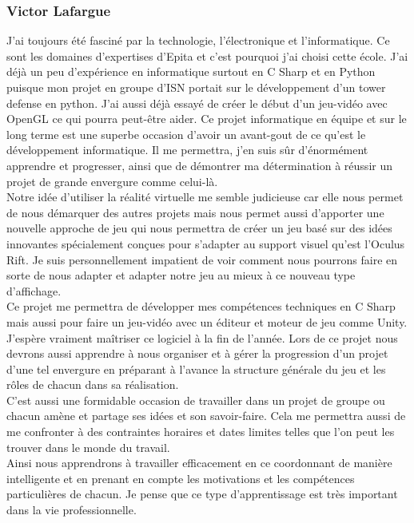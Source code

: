 \documentclass[12pt]{article}
\begin{document}
\subsubsection{Victor Lafargue}

J'ai toujours été fasciné par la technologie, l'électronique et l'informatique. Ce sont les domaines d'expertises d'Epita et c'est pourquoi j'ai choisi cette école. J'ai déjà un peu d'expérience en informatique surtout en \gls{C Sharp} et en \gls{Python} puisque mon projet en groupe d'ISN portait sur le développement d'un tower defense en python. J'ai aussi déjà essayé de créer le début d'un jeu-vidéo avec \gls{OpenGL} ce qui pourra peut-être aider. Ce projet informatique en équipe et sur le long terme est une superbe occasion d'avoir un  avant-gout de ce qu'est le développement informatique. Il me permettra, j'en suis sûr d'énormément apprendre et progresser, ainsi que de démontrer ma détermination à réussir un projet de grande envergure comme celui-là.\\

Notre idée d'utiliser la réalité virtuelle me semble judicieuse car elle nous permet de nous démarquer des autres projets mais nous permet aussi d'apporter une nouvelle approche de jeu qui nous permettra de créer un jeu basé sur des idées innovantes spécialement conçues pour s'adapter au support visuel qu'est l'Oculus Rift. Je suis personnellement impatient de voir comment nous pourrons faire en sorte de nous adapter et adapter notre jeu au mieux à ce nouveau type d'affichage.\\

Ce projet me permettra de développer mes compétences techniques en \gls{C Sharp} mais aussi pour faire un jeu-vidéo avec un éditeur et moteur de jeu comme Unity. J'espère vraiment maîtriser ce logiciel à la fin de l'année. Lors de ce projet nous devrons aussi apprendre à nous organiser et à gérer la progression d'un projet d'une tel envergure en préparant à l'avance la structure générale du jeu et les rôles de chacun dans sa réalisation.\\

C'est aussi une formidable occasion de travailler dans un projet de groupe ou chacun amène et partage ses idées et son savoir-faire. Cela me permettra aussi de me confronter à des contraintes horaires et dates limites telles que l'on peut les trouver dans le monde du travail.\\

Ainsi nous apprendrons à travailler efficacement en ce coordonnant de manière intelligente et en prenant en compte les motivations et les compétences particulières de chacun. Je pense que ce type d'apprentissage est très important dans la vie professionnelle.
\end{document}
